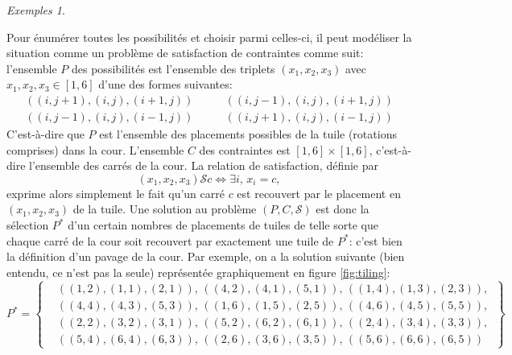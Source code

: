 \documentclass[french,a4paper]{article}
\theoremstyle{definition}
\theoremstyle{remark}
\newtheorem*{examples}{Exemples}
\begin{document}
\begin{examples}
\begin{enumerate}[label=(\arabic*)]
    Pour énumérer toutes les possibilités et choisir parmi celles-ci,
    il peut modéliser la situation comme un problème de satisfaction
    de contraintes comme suit: l'ensemble $P$ des possibilités est
    l'ensemble des triplets $(x_1,x_2,x_3)$ avec
    $x_1,x_2,x_3 \in [1,6]$ d'une des formes suivantes:
    \begin{displaymath}
      \begin{aligned}
        ((i,j+1),(i,j),(i+1,j)) &\qquad
        ((i,j-1),(i,j),(i+1,j))\\
        ((i,j-1),(i,j),(i-1,j)) &\qquad
        ((i,j+1),(i,j),(i-1,j))
      \end{aligned}
    \end{displaymath}
    C'est-à-dire que $P$ est l'ensemble des placements possibles de la
    tuile (rotations comprises) dans la cour. L'ensemble $C$ des
    contraintes est $[1,6] \times [1,6]$, c'est-à-dire l'ensemble des
    carrés de la cour. La relation de satisfaction, définie par
    \begin{displaymath}
      (x_1,x_2,x_3) \mathrel{\mathcal S} c \iff \exists i,\, x_i = c,
    \end{displaymath}
    exprime alors simplement le fait qu'un carré $c$ est recouvert par
    le placement en $(x_1,x_2,x_3)$ de la tuile. Une solution au
    problème $(P,C,\mathcal S)$ est donc la sélection $P^\ast$ d'un
    certain nombres de placements de tuiles de telle sorte que chaque
    carré de la cour soit recouvert par exactement une tuile de
    $P^\ast$: c'est bien la définition d'un pavage de la cour. Par
    exemple, on a la solution suivante (bien entendu, ce n'est pas la
    seule) représentée graphiquement en figure \ref{fig:tiling}:
    \begin{displaymath}
      P^\ast = \left\{
        \begin{aligned}
          &((1,2),(1,1),(2,1)),\,
          ((4,2),(4,1),(5,1)),\,
          ((1,4),(1,3),(2,3)),\\
          &((4,4),(4,3),(5,3)),\,
          ((1,6),(1,5),(2,5)),\,
          ((4,6),(4,5),(5,5)),\,\\
          &((2,2),(3,2),(3,1)),\,
          ((5,2),(6,2),(6,1)),\,
          ((2,4),(3,4),(3,3)),\\
          &((5,4),(6,4),(6,3)),\,
          ((2,6),(3,6),(3,5)),\,
          ((5,6),(6,6),(6,5))
        \end{aligned}
      \right\}
    \end{displaymath}
    \begin{figure}[h!]

\end{figure}
\end{enumerate}
\end{examples}
\end{document}
